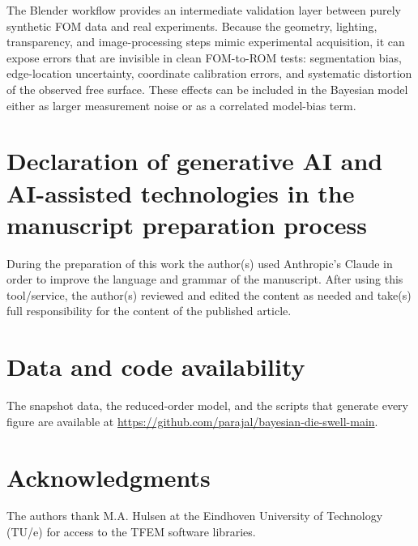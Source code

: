 \documentclass{elsarticle}
\begin{document}
The Blender workflow provides an intermediate validation layer between purely
synthetic FOM data and real experiments. Because the geometry, lighting,
transparency, and image-processing steps mimic experimental acquisition, it can
expose errors that are invisible in clean FOM-to-ROM tests: segmentation bias,
edge-location uncertainty, coordinate calibration errors, and systematic
distortion of the observed free surface. These effects can be included in the
Bayesian model either as larger measurement noise or as a correlated model-bias
term.


\FloatBarrier
\section*{Declaration of generative AI and AI-assisted technologies in the manuscript preparation process}

During the preparation of this work the author(s) used Anthropic's Claude in order to improve the language and grammar of the manuscript. After using this tool/service, the author(s) reviewed and edited the content as needed and take(s) full responsibility for the content of the published article.

\section*{Data and code availability}
The snapshot data, the reduced-order model, and the scripts that generate every figure are available at \url{https://github.com/parajal/bayesian-die-swell-main}.
\section*{Acknowledgments}
The authors thank M.A. Hulsen at the Eindhoven University of Technology (TU/e) for access to the TFEM software libraries.

\FloatBarrier



\end{document}
